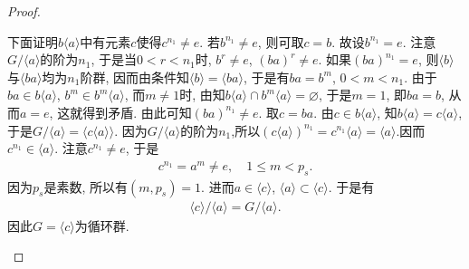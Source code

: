 \documentclass[../../main.tex]{subfiles}%
\begin{document}
\begin{proof}
\begin{enumerate}[(1)]
下面证明$b\langle a\rangle$中有元素$c$使得$c^{n_1}\neq e$. 若$b^{n_1}\neq e$, 则可取$c=b$. 故设$b^{n_1}=e$. 注意$G/\langle a\rangle$的阶为$n_1$, 于是当$0<r<n_1$时, $b^r\neq e$, $(ba)^r\neq e$.
如果$(ba)^{n_1}=e$, 则$\langle b\rangle$与$\langle ba\rangle$均为$n_1$阶群, 因而由条件知$\langle b\rangle=\langle ba\rangle$, 于是有$ba=b^m$, $0<m<n_1$. 由于$ba\in b\langle a\rangle$, $b^m\in b^m\langle a\rangle$, 而$m\neq 1$时, 由知$b\langle a\rangle\cap b^m\langle a\rangle=\varnothing$, 于是$m=1$, 即$ba=b$, 从而$a=e$, 这就得到矛盾. 由此可知$(ba)^{n_1}\neq e$. 取$c=ba$.
由$c\in b\langle a\rangle$, 知$b\langle a\rangle=c\langle a\rangle$, 于是$G/\langle a\rangle=\langle c\langle a\rangle\rangle$. 因为$G/\langle a \rangle$的阶为$n_1$,所以$(c\langle a \rangle)^{n_1}=c^{n_1}\langle a \rangle=\langle a \rangle$.因而$c^{n_1}\in\langle a\rangle$. 注意$c^{n_1}\neq e$, 于是
\begin{align*}
c^{n_1}=a^m\neq e,\quad 1\leqslant m<p_s.
\end{align*}
因为$p_s$是素数, 所以有$(m,p_s)=1$. 进而$a\in\langle c\rangle$, $\langle a\rangle\subset\langle c\rangle$. 于是有
\begin{align*}
\langle c\rangle/\langle a\rangle=G/\langle a\rangle.
\end{align*}
因此$G=\langle c\rangle$为循环群.
\end{enumerate}
\end{proof}
\end{document}
